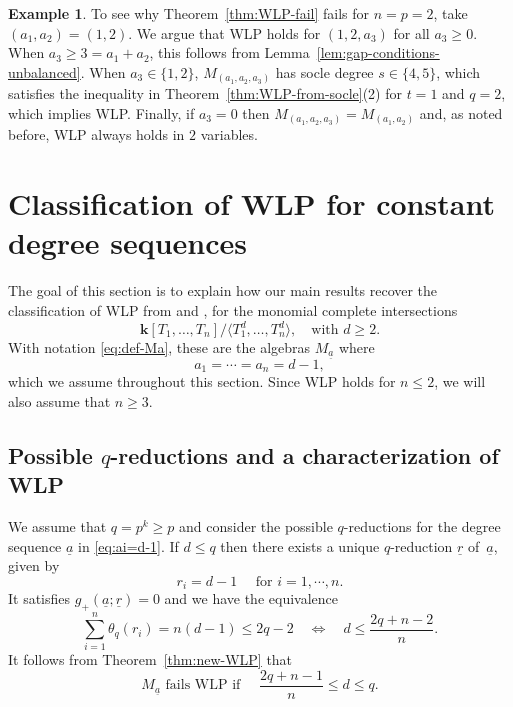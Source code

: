 \documentclass[11pt,reqno]{amsart}
\def\kk{{\mathbf k}}
\newcommand{\ul}[1]{\underline{#1}}
\theoremstyle{definition}
\newtheorem{example}[theorem]{Example}
\theoremstyle{remark}
\numberwithin{equation}{section}
\begin{document}
\begin{example}\label{ex:pn=2-allWLP}
    To see why Theorem~\ref{thm:WLP-fail} fails for $n=p=2$, take $(a_1,a_2)=(1,2)$. We argue that WLP holds for $(1,2,a_3)$ for all $a_3\geq 0$. When $a_3\geq 3=a_1+a_2$, this follows from Lemma~\ref{lem:gap-conditions-unbalanced}. When $a_3\in\{1,2\}$, $M_{(a_1,a_2,a_3)}$ has socle degree $s\in\{4,5\}$, which satisfies the inequality in Theorem~\ref{thm:WLP-from-socle}(2) for $t=1$ and $q=2$, which implies WLP. Finally, if $a_3=0$ then $M_{(a_1,a_2,a_3)}=M_{(a_1,a_2)}$ and, as noted before, WLP always holds in $2$ variables.
\end{example}

\section{Classification of WLP for constant degree sequences}
\label{sec:WLP-constant-degs}

The goal of this section is to explain how our main results recover the classification of WLP from \cite{bre-kai} and 
\cite{kus-vra}, for the monomial complete intersections
\begin{equation}\label{eq:KT-mod-Td}
\kk[T_1,\ldots,T_n]/\langle T_1^{d},\ldots,T_n^{d}\rangle,\quad \text{with }d\geq 2.
\end{equation}
With notation \eqref{eq:def-Ma}, these are the algebras $M_{\ul{a}}$ where
\begin{equation}\label{eq:ai=d-1} 
a_1=\cdots=a_n=d-1,
\end{equation}
which we assume throughout this section. Since WLP holds for $n\leq 2$, we will also assume that $n\geq 3$.

\subsection{Possible $q$-reductions and a characterization of WLP}

We assume that $q=p^k\geq p$ and consider the possible $q$-reductions for the degree sequence $\ul{a}$ in \eqref{eq:ai=d-1}. If $d\leq q$ then there exists a unique $q$-reduction $\ul{r}$ of~$\ul{a}$, given by
\[ r_i = d-1\quad\text{ for }i=1,\cdots,n.\]
It satisfies $g_+(\ul{a};\ul{r})=0$ and we have the equivalence
\[\sum_{i=1}^n \theta_q(r_i) = n(d-1)\leq 2q-2 \quad\Longleftrightarrow\quad d\leq\frac{2q+n-2}{n}.\]
It follows from Theorem~\ref{thm:new-WLP} that
\begin{equation}\label{eq:Md-easyfail-WLP}
M_{\ul{a}}\text{ fails WLP if }\quad\frac{2q+n-1}{n}\leq d\leq q.
\end{equation}
\end{document}
